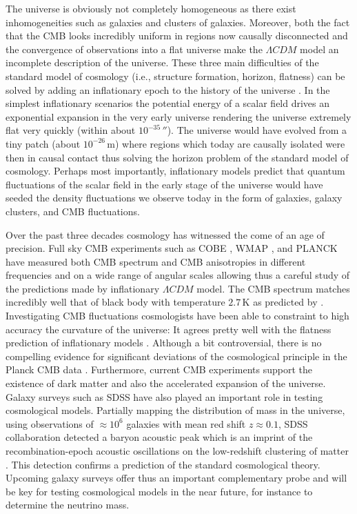 The universe is obviously not completely homogeneous as there exist inhomogeneities such as galaxies and clusters of galaxies. Moreover, both the fact that the CMB looks incredibly uniform in regions now causally disconnected and the convergence of observations into a flat universe make the $\Lambda CDM$ model an incomplete description of the universe. These three main difficulties of the standard model of cosmology (i.e., structure formation, horizon, flatness) can be solved by adding an inflationary epoch to the history of the universe . In the simplest inflationary scenarios the potential energy of a scalar field drives an exponential expansion in the very early universe rendering the universe extremely flat very quickly (within about $10^{-35}\, \second$). The universe would have evolved from a tiny patch (about $10^{-26}\,\mathrm{m}$) where regions which today are causally isolated were then in causal contact thus solving the horizon problem of the standard model of cosmology. Perhaps most importantly, inflationary models predict that quantum fluctuations of the scalar field in the early stage of the universe would have seeded the density fluctuations we observe today in the form of galaxies, galaxy clusters, and CMB fluctuations.

Over the past three decades cosmology has witnessed the come of an age of precision. Full sky CMB experiments such as COBE , WMAP , and PLANCK  have measured both CMB spectrum and CMB anisotropies in different frequencies and on a wide range of angular scales allowing thus a careful study of the predictions made by inflationary $\Lambda CDM$ model. The CMB spectrum matches incredibly well that of black body with temperature $2.7\,\mathrm{K}$ as predicted by . Investigating CMB fluctuations cosmologists have been able to constraint to high accuracy the curvature of the universe: It agrees pretty well with the flatness prediction of inflationary models . Although a bit controversial, there is no compelling evidence for significant deviations of the cosmological principle in the Planck CMB data . Furthermore, current CMB experiments support the existence of dark matter and also the accelerated expansion of the universe. Galaxy surveys such as SDSS have also played an important role in testing cosmological models. Partially mapping the distribution of mass in the universe, using observations of $\approx 10^6$ galaxies with mean red shift $z \approx 0.1$, SDSS collaboration detected a baryon acoustic peak which is an imprint of the recombination-epoch acoustic oscillations on the low-redshift clustering of matter . This detection confirms a prediction of the standard cosmological theory. Upcoming galaxy surveys offer thus an important complementary probe and will be key for testing cosmological models in the near future, for instance to determine the neutrino mass.

